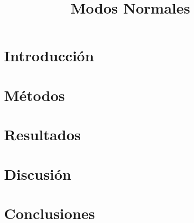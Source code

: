 \documentclass[pdflatex,sn-mathphys-num]{sn-jnl}
\begin{document}
\title[Modos Normales]{\textbf{Modos Normales}}
\author[1]{ }
\author[1]{ }
\author[1]{ }


\maketitle

\section{Introducción}%
\label{sec:Introducción}

\section{Métodos}%
\label{sec:Métodos}

\section{Resultados}%
\label{sec:Resultados}

\section{Discusión}%
\label{sec:Discusión}

\section{Conclusiones}%
\label{sec:Conclusiones}


\end{document}
